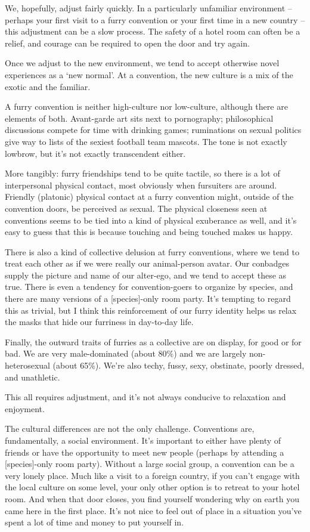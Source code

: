 We, hopefully, adjust fairly quickly. In a particularly unfamiliar environment -- perhaps your first visit to a furry convention or your first time in a new country -- this adjustment can be a slow process. The safety of a hotel room can often be a relief, and courage can be required to open the door and try again.

Once we adjust to the new environment, we tend to accept otherwise novel experiences as a `new normal'. At a convention, the new culture is a mix of the exotic and the familiar.

A furry convention is neither high-culture nor low-culture, although there are elements of both. Avant-garde art sits next to pornography; philosophical discussions compete for time with drinking games; ruminations on sexual politics give way to lists of the sexiest football team mascots. The tone is not exactly lowbrow, but it's not exactly transcendent either.

More tangibly: furry friendships tend to be quite tactile, so there is a lot of interpersonal physical contact, most obviously when fursuiters are around. Friendly (platonic) physical contact at a furry convention might, outside of the convention doors, be perceived as sexual. The physical closeness seen at conventions seems to be tied into a kind of physical exuberance as well, and it's easy to guess that this is because touching and being touched makes us happy.

There is also a kind of collective delusion at furry conventions, where we tend to treat each other as if we were really our animal-person avatar. Our conbadges supply the picture and name of our alter-ego, and we tend to accept these as true. There is even a tendency for convention-goers to organize by species, and there are many versions of a [species]-only room party. It's tempting to regard this as trivial, but I think this reinforcement of our furry identity helps us relax the masks that hide our furriness in day-to-day life.

Finally, the outward traits of furries as a collective are on display, for good or for bad. We are very male-dominated (about 80\%) and we are largely non-heterosexual (about 65\%). We're also techy, fussy, sexy, obstinate, poorly dressed, and unathletic.

This all requires adjustment, and it's not always conducive to relaxation and enjoyment.

The cultural differences are not the only challenge. Conventions are, fundamentally, a social environment. It's important to either have plenty of friends or have the opportunity to meet new people (perhaps by attending a [species]-only room party). Without a large social group, a convention can be a very lonely place. Much like a visit to a foreign country, if you can't engage with the local culture on some level, your only other option is to retreat to your hotel room. And when that door closes, you find yourself wondering why on earth you came here in the first place. It's not nice to feel out of place in a situation you've spent a lot of time and money to put yourself in.

